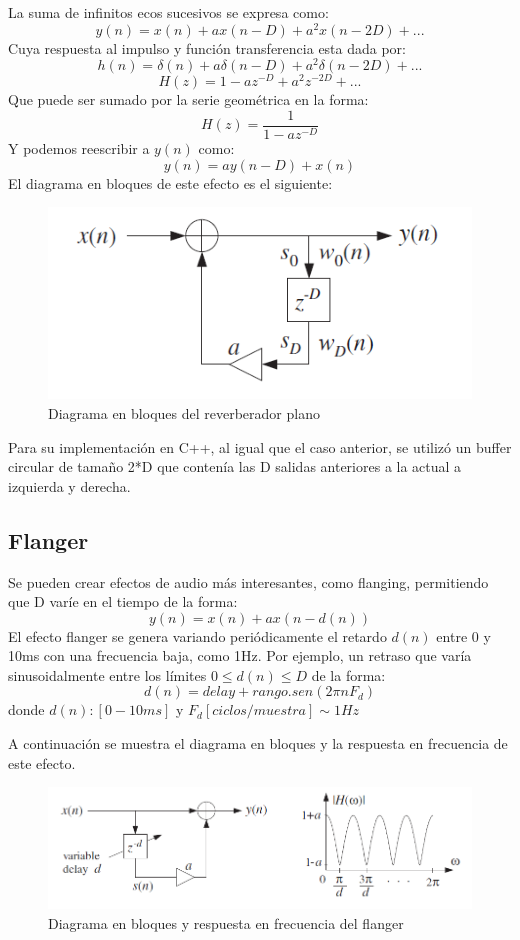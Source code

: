 \documentclass{report}
\begin{document}
La suma de infinitos ecos sucesivos se expresa como:
$$y(n)=x(n)+ax(n-D)+a^{2}x(n-2D)+...$$
Cuya respuesta al impulso y funci\'{o}n transferencia esta dada por:
$$h(n)=\delta(n)+a\delta(n-D)+a^{2}\delta(n-2D)+...$$
$$H(z)=1-az^{-D}+a^2z^{-2D}+...$$
Que puede ser sumado por la serie geométrica en la forma:
$$H(z)=\frac{1}{1-az^{-D}}$$
Y podemos reescribir a $y(n)$ como:
$$y(n)=ay(n-D)+x(n)$$
El diagrama en bloques de este efecto es el siguiente:
\begin{figure}[h]
  \centering
    \includegraphics[scale=1]{imagenes/diag_eco_plano.png}
  \caption{ Diagrama en bloques del reverberador plano}
  \label{fig:SI}
\end{figure}

Para su implementaci\'{o}n en C++, al igual que el caso anterior, se utiliz\'{o} un buffer circular de tamaño 2*D que conten\'{i}a las D salidas anteriores a la actual a izquierda y derecha.

\subsection*{Flanger}
Se pueden crear efectos de audio más interesantes, como flanging,
permitiendo que D varíe en el tiempo de la forma: 
$$y(n)=x(n)+ax(n-d(n))$$
El efecto flanger se genera variando peri\'{o}dicamente el retardo $d(n)$ entre 0 y 10ms con una frecuencia baja, como 1Hz. Por ejemplo, un retraso que var\'{i}a sinusoidalmente entre los l\'{i}mites $0{\leq}d(n){\leq}D$ de la forma:
$$ d(n)= delay + rango .  sen(2{\pi}nF_d )$$
donde $d(n): [0-10ms]$ y $F_d[ciclos/muestra]{\sim}1Hz$

A continuaci\'{o}n se muestra el diagrama en bloques y la respuesta en frecuencia de este efecto.

\begin{figure}[h]
  \centering
    \includegraphics[scale=1]{imagenes/diag_flang.png}
  \caption{ Diagrama en bloques y respuesta en frecuencia del flanger}
  \label{fig:SI}
\end{figure}
\end{document}
